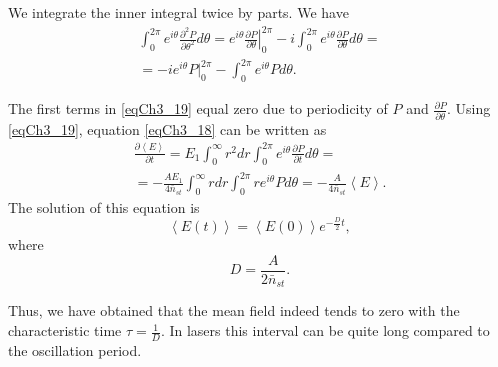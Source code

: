 We integrate the inner integral twice by parts. We have
\begin{eqnarray}
\int_0^{2 \pi} e^{i \theta}
\frac{\partial^2 P}{\partial \theta^2} d \theta = 
e^{i \theta} \left.\frac{\partial P}{\partial \theta}\right|_0^{2 \pi}
- i \int_0^{2 \pi} e^{i \theta}
\frac{\partial P}{\partial \theta} d \theta = 
\nonumber \\
= -i e^{i \theta} \left. P \right|_0^{2 \pi} - 
\int_0^{2 \pi} e^{i \theta} P d \theta.
\label{eqCh3_19}
\end{eqnarray}

The first terms in \eqref{eqCh3_19} equal zero due to periodicity of $P$ and $\frac{\partial P}{\partial \theta}$. Using \eqref{eqCh3_19},
equation \eqref{eqCh3_18} can be written as 
\begin{eqnarray}
  \frac{\partial \left<E\right>}{\partial t} =
  E_1 \int_0^{\infty}r^2 dr \int_0^{2\pi}e^{i\theta}\frac{\partial
    P}{\partial t} d \theta
  =
  \nonumber \\
  = 
- \frac{A E_1}{4 \bar{n}_{st}}
\int_0^{\infty}r dr\int_0^{2 \pi}r e^{i \theta} P d \theta = 
- \frac{A}{4 \bar{n}_{st}} \left<E\right>.
\label{eqCh3_20}
\end{eqnarray}
The solution of this equation is 
\begin{equation}
\left<E\left(t\right)\right> = 
\left<E\left(0\right)\right> e^{- \frac{D}{2}t},
\label{eqCh3_21}
\end{equation}
where 
\begin{equation}
D = \frac{A}{2 \bar{n}_{st}}.
\label{eqCh3_21a}
\end{equation}

Thus, we have obtained that the mean field indeed tends to
zero with the characteristic time $\tau = \frac{1}{D}$. In lasers this
interval can be quite long compared to the oscillation period.

